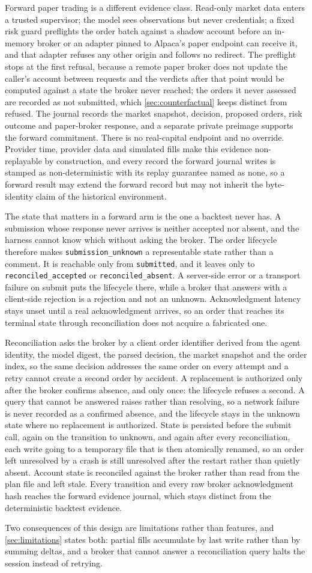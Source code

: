 Forward paper trading is a different evidence class. Read-only market data enters a trusted supervisor; the model sees observations but never credentials; a fixed risk guard preflights the order batch against a shadow account before an in-memory broker or an adapter pinned to Alpaca's paper endpoint can receive it, and that adapter refuses any other origin and follows no redirect. The preflight stops at the first refusal, because a remote paper broker does not update the caller's account between requests and the verdicts after that point would be computed against a state the broker never reached; the orders it never assessed are recorded as not submitted, which \cref{sec:counterfactual} keeps distinct from refused. The journal records the market snapshot, decision, proposed orders, risk outcome and paper-broker response, and a separate private preimage supports the forward commitment. There is no real-capital endpoint and no override. Provider time, provider data and simulated fills make this evidence non-replayable by construction, and every record the forward journal writes is stamped as non-deterministic with its replay guarantee named as none, so a forward result may extend the forward record but may not inherit the byte-identity claim of the historical environment.

The state that matters in a forward arm is the one a backtest never has. A submission whose response never arrives is neither accepted nor absent, and the harness cannot know which without asking the broker. The order lifecycle therefore makes \texttt{submission\_unknown} a representable state rather than a comment. It is reachable only from \texttt{submitted}, and it leaves only to \texttt{reconciled\_accepted} or \texttt{reconciled\_absent}. A server-side error or a transport failure on submit puts the lifecycle there, while a broker that answers with a client-side rejection is a rejection and not an unknown. Acknowledgment latency stays unset until a real acknowledgment arrives, so an order that reaches its terminal state through reconciliation does not acquire a fabricated one.

Reconciliation asks the broker by a client order identifier derived from the agent identity, the model digest, the parsed decision, the market snapshot and the order index, so the same decision addresses the same order on every attempt and a retry cannot create a second order by accident. A replacement is authorized only after the broker confirms absence, and only once: the lifecycle refuses a second. A query that cannot be answered raises rather than resolving, so a network failure is never recorded as a confirmed absence, and the lifecycle stays in the unknown state where no replacement is authorized. State is persisted before the submit call, again on the transition to unknown, and again after every reconciliation, each write going to a temporary file that is then atomically renamed, so an order left unresolved by a crash is still unresolved after the restart rather than quietly absent. Account state is reconciled against the broker rather than read from the plan file and left stale. Every transition and every raw broker acknowledgment hash reaches the forward evidence journal, which stays distinct from the deterministic backtest evidence.

Two consequences of this design are limitations rather than features, and \cref{sec:limitations} states both: partial fills accumulate by last write rather than by summing deltas, and a broker that cannot answer a reconciliation query halts the session instead of retrying.
